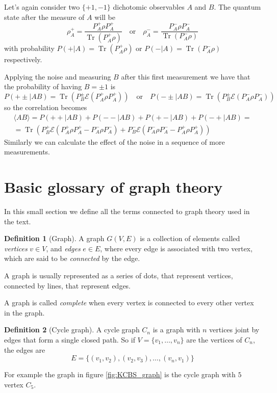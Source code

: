 \documentclass[a4paper]{article}
\DeclareMathOperator{\Tr}{Tr}
\newcommand{\qE}{\mathcal{E}}
\theoremstyle{definition}
\newtheorem{definition}{Definition}[section]
\begin{document}
Let's again consider two $\{+1,-1\}$ dichotomic observables $A$ and $B$.
The quantum state after the measure of $A$ will be
\begin{equation}
    \rho_A^+ = \frac{P_A^+\rho P_A^+}{\Tr\left( P_A^+\rho \right)} 
    \quad \text{or} \quad
    \rho_A^- = \frac{P_A^-\rho P_A^-}{\Tr\left( P_A^-\rho \right)}
    \label{eq:projective_measure_A}
\end{equation}
with probability $P(+|A) = \Tr\left( P_A^+ \rho \right)$ or $P(-|A) = \Tr\left(
P_A^- \rho \right)$ respectively.

Applying the noise and measuring $B$ after this first measurement we have that
the probability of having $B=\pm 1$ is
\begin{equation}
    P(+\pm|AB) = \Tr\left( P_B^\pm \qE\left(P_A^+\rho P_A^+\right) \right)
    \quad \text{or} \quad
    P(-\pm|AB) = \Tr\left( P_B^\pm \qE\left(P_A^-\rho P_A^-\right) \right)
\end{equation}
so the correlation becomes
\begin{multline}
    \langle{AB}\rangle = P(++|AB) + P(--|AB) + P(+-|AB) + P(-+|AB) =\\
    = \Tr\left( P_B^+ \qE\left(P_A^+\rho P_A^+ - P_A^-\rho P_A^-\right) +
        P_B^- \qE\left(P_A^-\rho P_A^- - P_A^+\rho P_A^+\right)
    \right)
\end{multline}
Similarly we can calculate the effect of the noise in a sequence of more
measurements. 

\appendix
\section{Basic glossary of graph theory}
\label{sec:graph}
In this small section we define all the terms connected to graph theory used in
the text.
\begin{definition}[Graph]
    A graph $G(V,E)$ is a collection of elements called \emph{vertices} $v\in
    V$, and \emph{edges} $e\in E$, where every edge is associated with two
    vertex, which are said to be \emph{connected} by the edge.
\end{definition}
A graph is usually represented as a series of dots, that represent vertices,
connected by lines, that represent edges.

A graph is called \emph{complete} when every vertex is connected to every other vertex
in the graph.

\begin{definition}[Cycle graph]
    A cycle graph $C_n$ is a graph with $n$ vertices joint by edges that form a single closed path.
    So if $V = \{v_1,\ldots,v_n\}$ are the vertices of $C_n$, the edges are
    \begin{equation}
        E = \{(v_1,v_2),(v_2,v_3),\ldots,(v_n,v_1)\}
        \label{eq:cycle_edges}
    \end{equation}
\end{definition}
For example the graph in figure \ref{fig:KCBS_graph} is the cycle graph with
$5$ vertex $C_5$.
\end{document}
